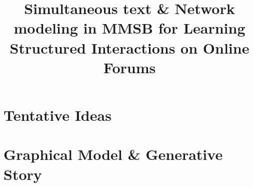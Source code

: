 \documentclass{article}
\title{Simultaneous text \& Network modeling in MMSB for Learning Structured
Interactions on Online Forums}
\begin{document}
\maketitle

\section{Tentative Ideas}


\section{Graphical Model \& Generative Story}

% 
% 
% 
% 
% 
% 
% 
% 


%

%
%


\end{document}
